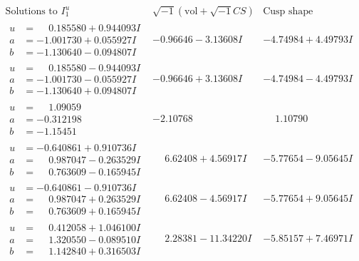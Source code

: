 \documentclass[1p]{elsarticle_modified}
\theoremstyle{definition}
\newcommand{\I}{\sqrt{-1}}
\begin{document}
$$\begin{array}{c|c|c}  
\text{Solutions to }I^u_{1}& \I (\text{vol} + \sqrt{-1}CS) & \text{Cusp shape}\\
 \hline 
\begin{aligned}
u &= \phantom{-}0.185580 + 0.944093 I \\
a &= -1.001730 + 0.055927 I \\
b &= -1.130640 - 0.094807 I\end{aligned}
 & -0.96646 - 3.13608 I & -4.74984 + 4.49793 I \\ \hline\begin{aligned}
u &= \phantom{-}0.185580 - 0.944093 I \\
a &= -1.001730 - 0.055927 I \\
b &= -1.130640 + 0.094807 I\end{aligned}
 & -0.96646 + 3.13608 I & -4.74984 - 4.49793 I \\ \hline\begin{aligned}
u &= \phantom{-}1.09059\phantom{ +0.000000I} \\
a &= -0.312198\phantom{ +0.000000I} \\
b &= -1.15451\phantom{ +0.000000I}\end{aligned}
 & -2.10768\phantom{ +0.000000I} & \phantom{-}1.10790\phantom{ +0.000000I} \\ \hline\begin{aligned}
u &= -0.640861 + 0.910736 I \\
a &= \phantom{-}0.987047 - 0.263529 I \\
b &= \phantom{-}0.763609 - 0.165945 I\end{aligned}
 & \phantom{-}6.62408 + 4.56917 I & -5.77654 - 9.05645 I \\ \hline\begin{aligned}
u &= -0.640861 - 0.910736 I \\
a &= \phantom{-}0.987047 + 0.263529 I \\
b &= \phantom{-}0.763609 + 0.165945 I\end{aligned}
 & \phantom{-}6.62408 - 4.56917 I & -5.77654 + 9.05645 I \\ \hline\begin{aligned}
u &= \phantom{-}0.412058 + 1.046100 I \\
a &= \phantom{-}1.320550 - 0.089510 I \\
b &= \phantom{-}1.142840 + 0.316503 I\end{aligned}
 & \phantom{-}2.28381 - 11.34220 I & -5.85157 + 7.46971 I \\ \hline\begin{aligned}

\end{aligned}
\end{array}$$
\end{document}
